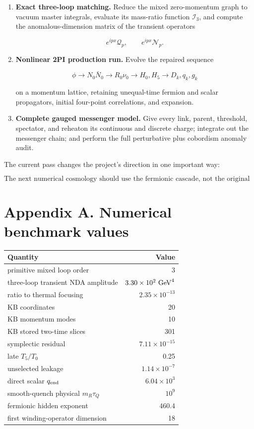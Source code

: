 \documentclass[
  10pt,
]{article}
\begin{document}
\begin{enumerate}
\def\labelenumi{\arabic{enumi}.}
\item
  \textbf{Exact three-loop matching.} Reduce the mixed zero-momentum
  graph to vacuum master integrals, evaluate its mass-ratio function
  \(\mathcal I_3\), and compute the anomalous-dimension matrix of the
  transient operators

  \[
  e^{ipx}\mathcal Q_p,
  \qquad
  e^{ipx}\mathcal N_p.
  \]
\item
  \textbf{Nonlinear 2PI production run.} Evolve the repaired sequence

  \[
  \phi\to N_0\bar N_0
  \to R_0\nu_0
  \to H_0,H_5
  \to D_k,q_k,g_k
  \]

  on a momentum lattice, retaining unequal-time fermion and scalar
  propagators, initial four-point correlations, and expansion.
\item
  \textbf{Complete gauged messenger model.} Give every link, parent,
  threshold, spectator, and reheaton its continuous and discrete charge;
  integrate out the messenger chain; and perform the full perturbative
  plus cobordism anomaly audit.
\end{enumerate}

The current pass changes the project's direction in one important way:

\[
\boxed{
\text{The next numerical cosmology should use the fermionic cascade, not the original scalar portal.}}
\]

\section{Appendix A. Numerical benchmark
values}\label{appendix-a.-numerical-benchmark-values}

\begin{longtable}[]{@{}lr@{}}
\toprule\noalign{}
Quantity & Value \\
\midrule\noalign{}
\endhead
\bottomrule\noalign{}
\endlastfoot
primitive mixed loop order & 3 \\
three-loop transient NDA amplitude & \(3.30\times10^2\ {\rm GeV}^4\) \\
ratio to thermal focusing & \(2.35\times10^{-13}\) \\
KB coordinates & 20 \\
KB momentum modes & 10 \\
KB stored two-time slices & 301 \\
symplectic residual & \(7.11\times10^{-15}\) \\
late \(T_5/T_0\) & 0.25 \\
unselected leakage & \(1.14\times10^{-7}\) \\
direct scalar \(q_{\rm end}\) & \(6.04\times10^3\) \\
smooth-quench physical \(m_R\tau_Q\) & \(10^9\) \\
fermionic hidden exponent & 460.4 \\
first winding-operator dimension & 18 \\
\end{longtable}
\end{document}
